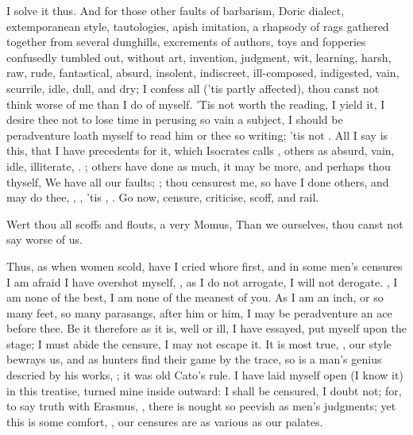 {I solve it thus. And for those other faults of barbarism, Doric
dialect, extemporanean style, tautologies, apish imitation, a rhapsody
of rags gathered together from several dunghills, excrements of
authors, toys and fopperies confusedly tumbled out, without art,
invention, judgment, wit, learning, harsh, raw, rude, fantastical,
absurd, insolent, indiscreet, ill-composed, indigested, vain, scurrile,
idle, dull, and dry; I confess all ('tis partly affected), thou canst
not think worse of me than I do of myself. 'Tis not worth the reading,
I yield it, I desire thee not to lose time in perusing so vain a
subject, I should be peradventure loath myself to read him or thee so
writing; 'tis not . All I say is this, that I have
precedents for it, which Isocrates calls , others as absurd, vain, idle, illiterate, \etc. ; others have done as much, it may be more, and perhaps
thou thyself,  We have all our faults; ; thou censurest me, so have I done others, and
may do thee, , \etc, 'tis , .
Go now, censure, criticise, scoff, and rail.

Wert thou all scoffs and flouts, a very Momus,
Than we ourselves, thou canst not say worse of us.

Thus, as when women scold, have I cried whore first, and in some men's
censures I am afraid I have overshot myself, , as I do not arrogate, I will not derogate. , I am none of the best, I am none of the
meanest of you. As I am an inch, or so many feet, so many parasangs,
after him or him, I may be peradventure an ace before thee. Be it
therefore as it is, well or ill, I have essayed, put myself upon the
stage; I must abide the censure, I may not escape it. It is most true,
, our style bewrays us, and as hunters find
their game by the trace, so is a man's genius descried by his works,
;
it was old Cato's rule. I have laid myself open (I know it) in this
treatise, turned mine inside outward: I shall be censured, I doubt not;
for, to say truth with Erasmus, , there
is nought so peevish as men's judgments; yet this is some comfort, , our censures are as various as our palates.

}
